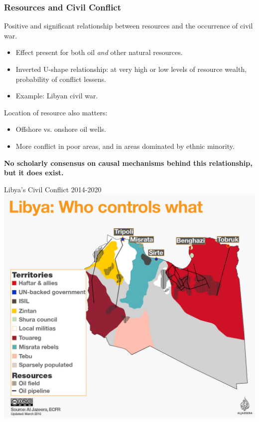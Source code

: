 \documentclass{beamer}
\begin{document}
\begin{frame} 
	\frametitle{\LARGE{Resources and Civil Conflict}}
	\begin{itemize}
		\large{
			\item Positive and significant relationship between resources and the occurrence of civil war. \pause
			\begin{itemize}
				\item Effect present for both oil \textit{and} other natural resources. \pause
				\item Inverted U-shape relationship: at very high or low levels of resource wealth, probability of conflict lessens. \pause
				\item Example: Libyan civil war. \pause
			\end{itemize}
			\item Location of resource also matters: \pause
			\begin{itemize}
				\item Offshore vs. onshore oil wells. \pause
				\item More conflict in poor areas, and in areas dominated by ethnic minority. \pause
			\end{itemize}
			\item \textbf{No scholarly consensus on causal mechanisms behind this relationship, but it does exist.}
		}
	\end{itemize}
\end{frame}

\begin{frame}{\LARGE Libya's Civil Conflict 2014-2020}
	\centering
	\includegraphics[width=\textwidth,height=0.8\textheight,keepaspectratio]{libya control.jpg}
\end{frame}
\end{document}

